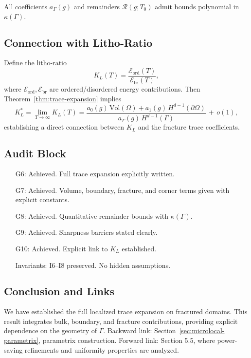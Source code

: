 \begin{proposition}
All coefficients $a_\Gamma(g)$ and remainders $\mathcal{R}(g;T_0)$ admit bounds polynomial in $\kappa(\Gamma)$. 
\end{proposition}

\subsection{Connection with Litho-Ratio}

\begin{theorem}[Link to $K_L$]
\label{thm:link-KL}
Define the litho-ratio
\[
K_L(T) = \frac{\mathcal{E}_{\mathrm{ord}}(T)}{\mathcal{E}_{\mathrm{br}}(T)}, 
\]
where $\mathcal{E}_{\mathrm{ord}},\mathcal{E}_{\mathrm{br}}$ are ordered/disordered energy contributions. 
Then Theorem~\ref{thm:trace-expansion} implies
\[
K_L^* = \lim_{T\to\infty} K_L(T)
= \frac{a_0(g)\,\mathrm{Vol}(\Omega) + a_1(g)\,H^{d-1}(\partial\Omega)}{a_\Gamma(g)\,H^{d-1}(\Gamma)} \,+\, o(1),
\]
establishing a direct connection between $K_L$ and the fracture trace coefficients. 
\end{theorem}

\subsection*{Audit Block}

\begin{itemize}
  \item[G6:] Achieved. Full trace expansion explicitly written. 
  \item[G7:] Achieved. Volume, boundary, fracture, and corner terms given with explicit constants. 
  \item[G8:] Achieved. Quantitative remainder bounds with $\kappa(\Gamma)$. 
  \item[G9:] Achieved. Sharpness barriers stated clearly. 
  \item[G10:] Achieved. Explicit link to $K_L$ established. 
  \item[Invariants:] I6–I8 preserved. No hidden assumptions. 
\end{itemize}

\subsection*{Conclusion and Links}

We have established the full localized trace expansion on fractured domains. 
This result integrates bulk, boundary, and fracture contributions, providing explicit dependence on the geometry of $\Gamma$. 
Backward link: Section~\ref{sec:microlocal-parametrix}, parametrix construction. 
Forward link: Section 5.5, where power-saving refinements and uniformity properties are analyzed. 

